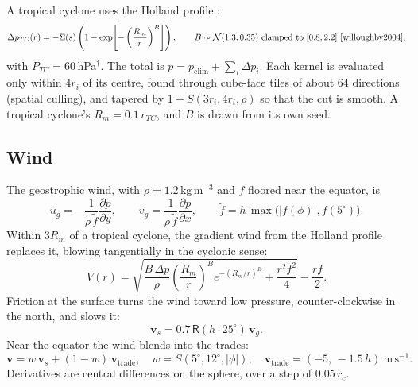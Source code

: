 \documentclass[11pt,a4paper]{article}
\begin{document}
A tropical cyclone uses the Holland profile \cite{holland1980}:
\begin{equation}
  \Delta p_{TC}(r)=-\Sigma(s)\left(1-\exp\!\left[-\left(\frac{R_m}{r}\right)^{B}\right]\right),
  \qquad B\sim\mathcal{N}(1.3,0.35)\ \text{clamped to }[0.8,2.2]
  \ \text{\cite{willoughby2004}},
\end{equation}
with $P_{TC}=60$\,hPa$^\dagger$. The total is
$p=p_{\mathrm{clim}}+\sum_i\Delta p_i$. Each kernel is evaluated only within $4r_i$ of its
centre, found through cube-face tiles of about 64 directions (spatial culling), and tapered by
$1-S(3r_i,4r_i,\rho)$ so that the cut is smooth. A tropical cyclone's $R_m=0.1\,r_{TC}$, and
$B$ is drawn from its own seed.

\subsection{Wind}
\label{sec:eq-wind}
The geostrophic wind, with $\rho=1.2$\,kg\,m$^{-3}$ and $f$ floored near the equator, is
\begin{equation}
  u_g=-\frac{1}{\rho\,\tilde f}\frac{\partial p}{\partial y},\qquad
  v_g=\frac{1}{\rho\,\tilde f}\frac{\partial p}{\partial x},\qquad
  \tilde f=h\,\max\!\big(|f(\phi)|,f(5^\circ)\big).
\end{equation}
Within $3R_m$ of a tropical cyclone, the gradient wind from the Holland profile replaces
it, blowing tangentially in the cyclonic sense:
\begin{equation}
  V(r)=\sqrt{\frac{B\,\Delta p}{\rho}\left(\frac{R_m}{r}\right)^{B}
  e^{-(R_m/r)^B}+\frac{r^2f^2}{4}}-\frac{rf}{2}.
\end{equation}
Friction at the surface turns the wind toward low pressure, counter-clockwise in the north,
and slows it:
\begin{equation}
  \mathbf{v}_s=0.7\,\mathsf{R}(h\cdot25^\circ)\,\mathbf{v}_g.
\end{equation}
Near the equator the wind blends into the trades:
\begin{equation}
  \mathbf{v}=w\,\mathbf{v}_s+(1-w)\,\mathbf{v}_{\mathrm{trade}},\quad
  w=S(5^\circ,12^\circ,|\phi|),\quad
  \mathbf{v}_{\mathrm{trade}}=(-5,\,-1.5\,h)\ \mathrm{m\,s^{-1}}.
\end{equation}
Derivatives are central differences on the sphere, over a step of $0.05\,r_c$.

\end{document}
